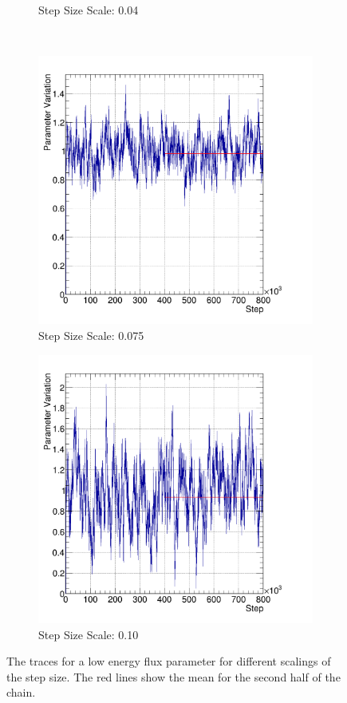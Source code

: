 \begin{figure}
\begin{subfigure}{.5\textwidth}
  \caption{Step Size Scale: 0.04}
  \label{fig:trace1}
\end{subfigure} \\
\begin{subfigure}{.5\textwidth}
  \centering
  \includegraphics[width=0.73\linewidth]{figs/trace2}
  \caption{Step Size Scale: 0.075}
  \label{fig:trace2}
\end{subfigure}%
\begin{subfigure}{.5\textwidth}
  \centering
  \includegraphics[width=0.73\linewidth]{figs/trace3}
  \caption{Step Size Scale: 0.10}
  \label{fig:trace3}
\end{subfigure}
\caption{The traces for a low energy flux parameter for different scalings of the step size. The red lines show the mean for the second half of the chain.}
\label{fig:traces}
\end{figure}

